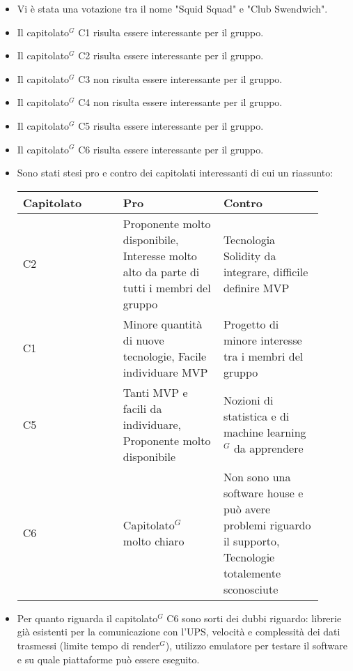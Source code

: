 \begin{itemize}
    \item Vi è stata una votazione tra il nome "Squid Squad" e "Club Swendwich".
    \item Il capitolato$^{G}$ C1 risulta essere interessante per il gruppo.
    \item Il capitolato$^{G}$ C2 risulta essere interessante per il gruppo.
    \item Il capitolato$^{G}$ C3 non risulta essere interessante per il gruppo.
    \item Il capitolato$^{G}$ C4 non risulta essere interessante per il gruppo.
    \item Il capitolato$^{G}$ C5 risulta essere interessante per il gruppo.
    \item Il capitolato$^{G}$ C6 risulta essere interessante per il gruppo.
    \item Sono stati stesi pro e contro dei capitolati interessanti di cui un riassunto: \\
        \begin{tabular}{|p{0.30\linewidth} |p{0.30\linewidth} |p{0.30 \linewidth}|}
        \hline
        Capitolato & Pro & Contro                                                                                                                                             \\
        \hline
        C2         & Proponente molto disponibile, Interesse molto alto da parte di tutti i membri del gruppo & Tecnologia Solidity da integrare, difficile definire MVP \\
        \hline
        C1         & Minore quantità di nuove tecnologie, Facile individuare MVP & Progetto di minore interesse tra i membri del gruppo \\
        \hline
        C5         & Tanti MVP e facili da individuare, Proponente molto disponibile & Nozioni di statistica e di machine learning$^{G}$ da apprendere \\
        \hline
        C6         & Capitolato$^{G}$ molto chiaro & Non sono una software house e può avere problemi riguardo il supporto, Tecnologie totalemente sconosciute \\
        \hline
        \end{tabular}
    \item Per quanto riguarda il capitolato$^{G}$ C6 sono sorti dei dubbi riguardo: librerie già esistenti per la comunicazione con l'UPS, velocità e complessità dei dati trasmessi (limite tempo di render$^{G}$), utilizzo emulatore per testare il software e su quale piattaforme può essere eseguito.

\end{itemize}
